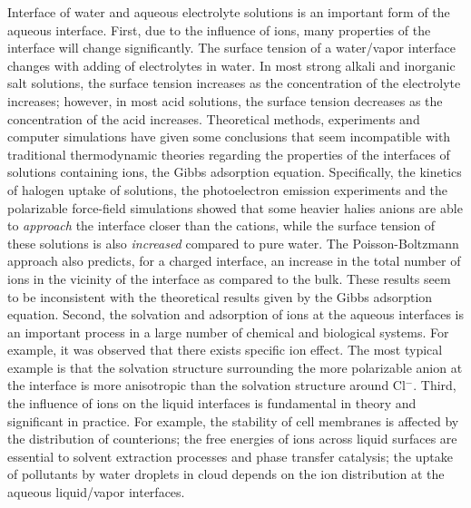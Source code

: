 Interface of water and aqueous electrolyte solutions is an important form of the aqueous interface.
First, due to the influence of ions, many properties of the interface will change significantly.
The surface tension of a water/vapor interface changes with adding of electrolytes in water\cite{Pegram2006}.
In most strong alkali and inorganic salt solutions, the surface tension increases as the concentration of the electrolyte increases; 
however, in most acid solutions, the surface tension decreases as the concentration of the acid increases.
Theoretical methods, experiments and computer simulations have given some conclusions that seem incompatible with traditional thermodynamic theories regarding the properties of the interfaces of solutions containing ions, the Gibbs adsorption equation.
Specifically, the kinetics of halogen uptake of solutions\cite{HuJH95}, the photoelectron emission experiments\cite{Markovich1991,Ghosal05,Garrett04} and the polarizable 
force-field simulations\cite{Perera1991,Dang1993,Knipping00,Jungwirth2001,Jungwirth2002,PJ06,Horinek07,Brown08,CST11} showed that 
some heavier halies anions are able to \emph{approach} the interface closer than the cations, 
while the surface tension of these solutions is also \emph{increased} compared to pure water. 
The Poisson-Boltzmann approach also predicts, for a charged interface, an increase in the total number of ions in the vicinity of the interface as compared to the bulk\cite{Manciu2003}.
These results seem to be inconsistent with the theoretical results given by the Gibbs adsorption equation\cite{Gibbs1928, Adam1941}.
Second, the solvation and adsorption of ions at the aqueous interfaces is an important process in a large number of chemical and biological systems\cite{Chang06}.
For example, it was observed that there exists specific ion effect. 
The most typical example is that the solvation structure surrounding the more polarizable \I anion at the interface is more anisotropic than the solvation structure around Cl$^-$.
Third, the influence of ions on the liquid interfaces is fundamental in theory and significant in practice.
For example, the stability of cell membranes is affected by the distribution of counterions\cite{Veziriglu1990}; 
the free energies of ions across liquid surfaces are essential to solvent extraction processes and phase transfer catalysis\cite{Starks1994};
the uptake of pollutants by water droplets in cloud depends on the ion distribution at the aqueous liquid/vapor interfaces.

